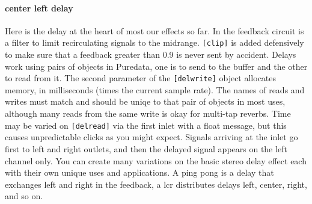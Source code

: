 \paragraph{center left delay}
Here is the delay at the heart of most our effects so far. In the feedback
circuit is a filter to limit recirculating signals to the midrange.
\verb+[clip]+ is added defensively to make sure that a feedback greater than
0.9 is never sent by accident.
Delays work using pairs of objects in Puredata, one is to send to
the buffer and the other to read from it. The second parameter of the 
\verb+[delwrite]+ object allocates memory, in milliseconds (times the
current sample rate). The names of reads and writes must match and should
be uniqe to that pair of objects in most uses, although many reads from
the same write is okay for multi-tap reverbs. Time may be varied on
\verb+[delread]+ via the first inlet with a float message, but this
causes unpredictable clicks as you might expect.
Signals arriving at the inlet go first to left and right outlets, and
then the delayed signal appears on the left channel only. You can create
many variations on the basic stereo delay effect each with their own
unique uses and applications. A ping pong is a delay that exchanges left
and right in the feedback, a lcr distributes delays left, center, right, and
so on. 

